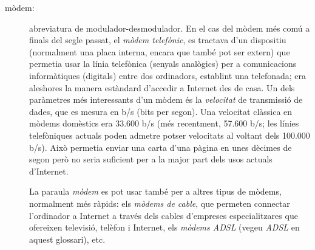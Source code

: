 \begin{description}
\item[mòdem:] abreviatura de modulador-desmodulador. En el cas del
  mòdem més comú a finals del segle passat, el \emph{mòdem telefònic},
  es tractava d'un dispositiu (normalment una placa interna, encara
  que també pot ser extern) que permetia usar la línia telefònica
  (senyals analògics) per a comunicacions informàtiques (digitals)
  entre dos ordinadors, establint una telefonada; era aleshores la
  manera estàndard d'accedir a Internet des de casa. Un dels
  paràmetres més interessants d'un mòdem és la
  \emph{velocitat} de transmissió de dades, que es mesura en b/s (bits
  per segon). Una velocitat clàssica en mòdems domèstics era 33.600
  b/s (més recentment, 57.600 b/s; les línies telefòniques actuals
  poden admetre potser velocitats al voltant dels 100.000 b/s).  Això
  permetia enviar una carta d'una pàgina en unes dècimes de segon però
  no seria suficient per a la major part dels usos actuals d'Internet.

  La paraula \emph{mòdem} es pot usar també per a altres tipus de
  mòdems, normalment més ràpids: els \emph{mòdems de cable}, que
  permeten connectar l'ordinador a Internet a través dels cables
  d'empreses especialitzares que ofereixen televisió, telèfon i
  Internet, els \emph{mòdems ADSL} (vegeu \emph{ADSL} en aquest
  glossari), etc.  



\end{description}
